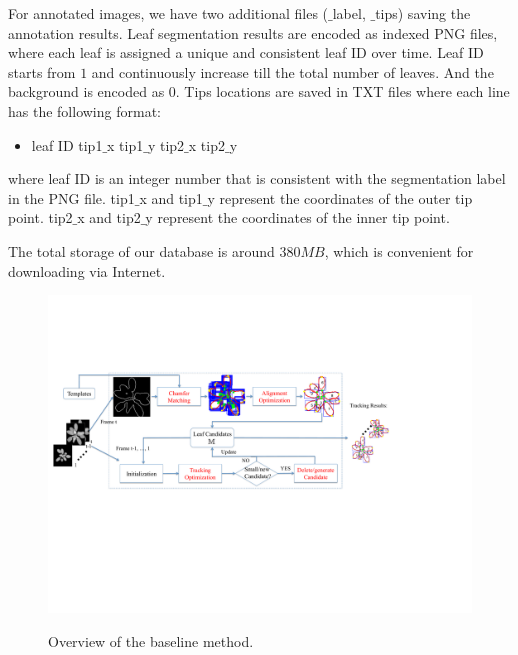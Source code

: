 For annotated images, we have two additional files ($\_$label, $\_$tips) saving the annotation results.
Leaf segmentation results are encoded as indexed PNG files, where each leaf is assigned a unique and consistent leaf ID over time.
Leaf ID starts from $1$ and continuously increase till the total number of leaves.
And the background is encoded as $0$.
Tips locations are saved in TXT files where each line has the following format:
\begin{itemize}
\item leaf ID \quad tip1$\_$x \quad tip1$\_$y \quad tip2$\_$x \quad tip2$\_$y
\end{itemize}
where leaf ID is an integer number that is consistent with the segmentation label in the PNG file.
tip1$\_$x and tip1$\_$y represent the coordinates of the outer tip point.
tip2$\_$x and tip2$\_$y represent the coordinates of the inner tip point.


The total storage of our database is around $380 MB$, which is convenient for downloading via Internet.

\begin{figure}[t!]
\centering
\includegraphics[width=.98\textwidth]{Figures/overview}\\
\caption{Overview of the baseline method.}
\label{fig:methodOverview}
\end{figure}

